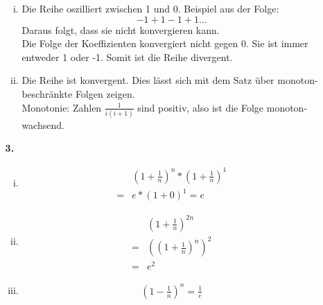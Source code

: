 \documentclass[a4paper]{scrartcl}
\begin{document}
\begin{enumerate}
\begin{enumerate}[a)]
\begin{enumerate}[(i)]
\item
Die Reihe oszilliert zwischen 1 und 0. Beispiel aus der Folge: 
\[-1 + 1 - 1 + 1 ... \]
Daraus folgt, dass sie nicht konvergieren kann.\\
Die Folge der Koeffizienten konvergiert nicht gegen 0. Sie ist immer entweder
1 oder -1. Somit ist die Reihe divergent.

\item
Die Reihe ist konvergent. Dies lässt sich mit dem Satz über monoton-beschränkte Folgen zeigen.\\
Monotonie: Zahlen \(\frac 1 {i(i+1)}\) sind positiv, also ist die Folge monoton-wachsend.
\end{enumerate}

\item[\textbf{3.}]
\begin{enumerate}[(i)]
\item
\begin{align}
&(1+\frac 1 n)^n*(1+\frac 1 n)^1\\
=& e*(1+0)^1=e
\end{align}

\item
\begin{align}
&(1+\frac 1 n)^{2n}\\
=& \left((1+\frac 1 n)^n\right)^2\\
=& e^2
\end{align}

\item
\begin{align}
\left(1-\frac 1 n\right)^n = \frac 1 e
\end{align}
\end{enumerate}
\end{enumerate}


\end{enumerate}
\end{document}
